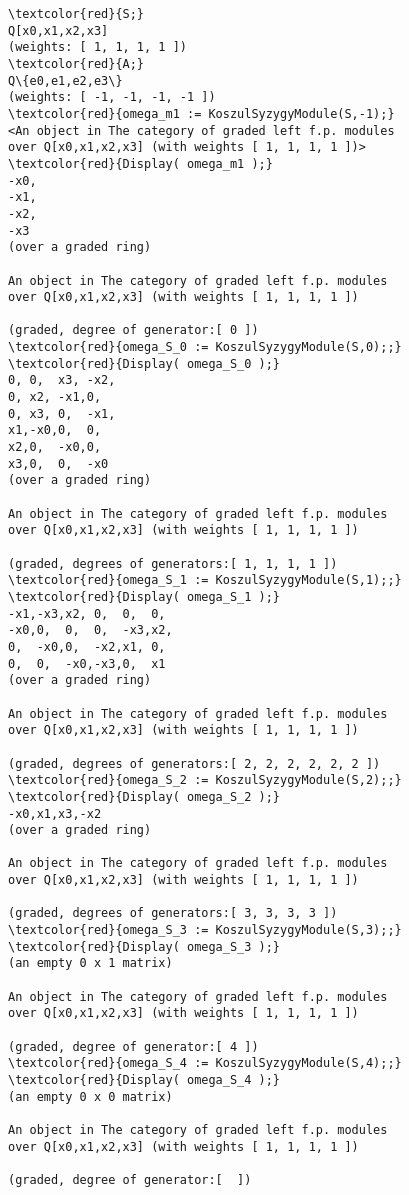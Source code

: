 \documentclass[16pt,a4paper]{extarticle}
\theoremstyle{definition}
\begin{document}
\begin{Verbatim}[commandchars=\\\{\}]
\textcolor{red}{S;}
Q[x0,x1,x2,x3]
(weights: [ 1, 1, 1, 1 ])
\textcolor{red}{A;}
Q\{e0,e1,e2,e3\}
(weights: [ -1, -1, -1, -1 ])
\textcolor{red}{omega_m1 := KoszulSyzygyModule(S,-1);}
<An object in The category of graded left f.p. modules
over Q[x0,x1,x2,x3] (with weights [ 1, 1, 1, 1 ])>
\textcolor{red}{Display( omega_m1 );}
-x0,
-x1,
-x2,
-x3 
(over a graded ring)

An object in The category of graded left f.p. modules
over Q[x0,x1,x2,x3] (with weights [ 1, 1, 1, 1 ])

(graded, degree of generator:[ 0 ])
\textcolor{red}{omega_S_0 := KoszulSyzygyModule(S,0);;}
\textcolor{red}{Display( omega_S_0 );}
0, 0,  x3, -x2,
0, x2, -x1,0,  
0, x3, 0,  -x1,
x1,-x0,0,  0,  
x2,0,  -x0,0,  
x3,0,  0,  -x0 
(over a graded ring)

An object in The category of graded left f.p. modules
over Q[x0,x1,x2,x3] (with weights [ 1, 1, 1, 1 ])

(graded, degrees of generators:[ 1, 1, 1, 1 ])
\textcolor{red}{omega_S_1 := KoszulSyzygyModule(S,1);;}
\textcolor{red}{Display( omega_S_1 );}
-x1,-x3,x2, 0,  0,  0, 
-x0,0,  0,  0,  -x3,x2,
0,  -x0,0,  -x2,x1, 0, 
0,  0,  -x0,-x3,0,  x1 
(over a graded ring)

An object in The category of graded left f.p. modules
over Q[x0,x1,x2,x3] (with weights [ 1, 1, 1, 1 ])

(graded, degrees of generators:[ 2, 2, 2, 2, 2, 2 ])
\textcolor{red}{omega_S_2 := KoszulSyzygyModule(S,2);;}
\textcolor{red}{Display( omega_S_2 );}
-x0,x1,x3,-x2
(over a graded ring)

An object in The category of graded left f.p. modules
over Q[x0,x1,x2,x3] (with weights [ 1, 1, 1, 1 ])

(graded, degrees of generators:[ 3, 3, 3, 3 ])
\textcolor{red}{omega_S_3 := KoszulSyzygyModule(S,3);;}
\textcolor{red}{Display( omega_S_3 );}
(an empty 0 x 1 matrix)

An object in The category of graded left f.p. modules
over Q[x0,x1,x2,x3] (with weights [ 1, 1, 1, 1 ])

(graded, degree of generator:[ 4 ])
\textcolor{red}{omega_S_4 := KoszulSyzygyModule(S,4);;}
\textcolor{red}{Display( omega_S_4 );}
(an empty 0 x 0 matrix)

An object in The category of graded left f.p. modules
over Q[x0,x1,x2,x3] (with weights [ 1, 1, 1, 1 ])

(graded, degree of generator:[  ])
\end{Verbatim}
\end{document}
